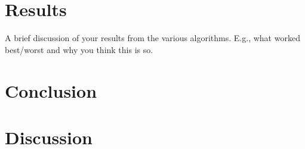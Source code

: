 \documentclass[11pt]{article}
\begin{document}
\begin{page}
\section{Results}
A brief discussion of your results from the various algorithms. E.g., what worked best/worst
and why you think this is so.\\

\section{Conclusion}


\section{Discussion}

\end{page}
\end{document}
